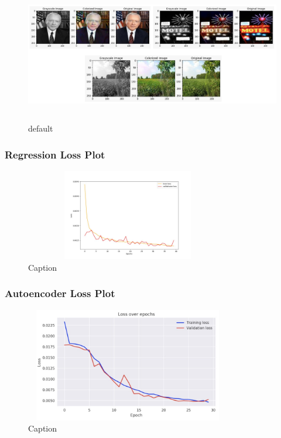 \documentclass{article}
\begin{document}
\begin{figure}[htp]

    \centering
    \includegraphics[width=15cm, height=6cm]{gan-inference.png}\hfill
    \caption{default}
    
\end{figure}

\subsubsection{Regression Loss Plot}

\begin{figure}[htbp!]
\begin{center}
    \includegraphics[width=9cm, height=4cm]{regression-plot.jpg}
    \caption{Caption}
\end{center}
\end{figure}

\subsubsection{Autoencoder Loss Plot}

\begin{figure}[htbp!]
\begin{center}
    \includegraphics[width=9cm, height=5cm]{encoder-decoder-plot.jpg}
    \caption{Caption}
\end{center}
\end{figure}
\end{document}
